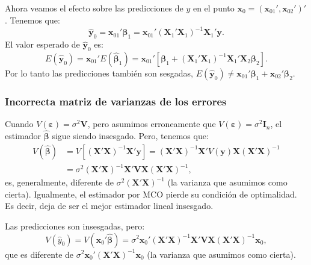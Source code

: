 \documentclass[
]{article}
\begin{document}
Ahora veamos el efecto sobre las predicciones de \(y\) en el punto \(\boldsymbol x_{0} = (\boldsymbol x_{01}', \boldsymbol x_{02}')'\). Tenemos que:
\[
\widehat{\boldsymbol y}_{0} = \boldsymbol x_{01}'\widehat{\boldsymbol \beta}_{1} = \boldsymbol x_{01}'(\boldsymbol X_{1}'\boldsymbol X_{1})^{-1}\boldsymbol X_{1}'\boldsymbol y.
\]
El valor esperado de \(\widehat{\boldsymbol y}_{0}\) es:
\[
E(\widehat{\boldsymbol y}_{0}) = \boldsymbol x_{01}'E(\widehat{\boldsymbol \beta}_{1}) = \boldsymbol x_{01}'\left[ \boldsymbol \beta_{1} +  (\boldsymbol X_{1}'\boldsymbol X_{1})^{-1}\boldsymbol X_{1}'\boldsymbol X_{2}\boldsymbol \beta_{2} \right]. 
\]
Por lo tanto las predicciones también son sesgadas, \(E(\widehat{\boldsymbol y}_{0}) \neq \boldsymbol x_{01}'\boldsymbol \beta_{1} + \boldsymbol x_{02}'\boldsymbol \beta_{2}\).

\subsubsection{Incorrecta matriz de varianzas de los errores}\label{incorrecta-matriz-de-varianzas-de-los-errores}

Cuando \(V(\boldsymbol \varepsilon) = \sigma^{2}\boldsymbol V\), pero asumimos erroneamente que \(V(\boldsymbol \varepsilon) = \sigma^{2}\boldsymbol I_{n}\), el estimador \(\widehat{\boldsymbol \beta}\) sigue siendo insesgado. Pero, tenemos que:
\begin{equation}
\begin{split}
V(\widehat{\boldsymbol \beta}) &= V\left[ (\boldsymbol X'\boldsymbol X)^{-1}\boldsymbol X'\boldsymbol y\right] = (\boldsymbol X'\boldsymbol X)^{-1}\boldsymbol X'V(\boldsymbol y)\boldsymbol X(\boldsymbol X'\boldsymbol X)^{-1} \\
&= \sigma^{2}(\boldsymbol X'\boldsymbol X)^{-1}\boldsymbol X'\boldsymbol V\boldsymbol X(\boldsymbol X'\boldsymbol X)^{-1},
\end{split}
\nonumber
\end{equation}
es, generalmente, diferente de \(\sigma^{2}(\boldsymbol X'\boldsymbol X)^{-1}\) (la varianza que asumimos como cierta). Igualmente, el estimador por MCO pierde su condición de optimalidad. Es decir, deja de ser el mejor estimador lineal insesgado.

Las predicciones son insesgadas, pero:
\[
V(\widehat{y}_{0}) = V(\boldsymbol x_{0}'\widehat{\boldsymbol \beta}) = \sigma^{2}\boldsymbol x_{0}'(\boldsymbol X'\boldsymbol X)^{-1}\boldsymbol X'\boldsymbol V\boldsymbol X(\boldsymbol X'\boldsymbol X)^{-1} \boldsymbol x_{0},
\]
que es diferente de \(\sigma^{2}\boldsymbol x_{0}'(\boldsymbol X'\boldsymbol X)^{-1}\boldsymbol x_{0}\) (la varianza que asumimos como cierta).
\end{document}
